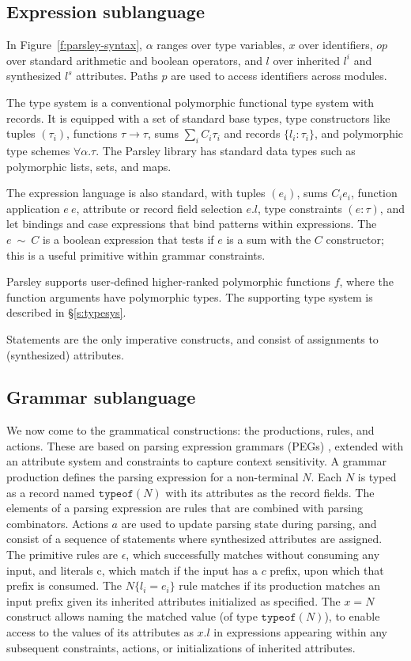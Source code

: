 \documentclass[letterpaper]{article}
\begin{document}
\subsection*{Expression sublanguage}
\label{ss:lang:expr}

In Figure~\ref{f:parsley-syntax}, $\alpha$ ranges over type variables,
$x$ over identifiers, $op$ over standard arithmetic and boolean
operators, and $l$ over inherited $l^i$ and synthesized $l^s$
attributes.  Paths $p$ are used to access identifiers across modules.

The type system is a conventional polymorphic functional type system
with records.  It is equipped with a set of standard base types, type
constructors like tuples $(\tau_i)$, functions $\tau\rightarrow\tau$,
sums $\sum_iC_i\tau_i$ and records $\{l_i:\tau_i\}$, and
polymorphic type schemes $\forall\alpha.\tau$.  The Parsley library
has standard data types such as polymorphic lists, sets, and maps.

The expression language is also standard, with tuples $(e_i)$, sums
$C_i e_i$, function application $e\ e$, attribute or record field
selection $e.l$, type constraints $(e:\tau)$, and let bindings and
case expressions that bind patterns within expressions.  The
$e\ \sim\ C$ is a boolean expression that tests if $e$ is a sum with
the $C$ constructor; this is a useful primitive within grammar
constraints.

Parsley supports user-defined higher-ranked polymorphic functions $f$,
where the function arguments have polymorphic types.  The supporting
type system is described in \S\ref{s:typesys}.

Statements are the only imperative constructs, and consist of
assignments to (synthesized) attributes.

\subsection*{Grammar sublanguage}
\label{ss:lang:grammar}

We now come to the grammatical constructions: the productions, rules,
and actions.  These are based on parsing expression grammars (PEGs)
\cite{ford2004popl}, extended with an attribute system and constraints
to capture context sensitivity.  A grammar production defines the
parsing expression for a non-terminal $N$.  Each $N$ is typed as a
record named $\texttt{typeof}(N)$ with its attributes as the record
fields.  The elements of a parsing expression are rules that are
combined with parsing combinators.  Actions $a$ are used to update
parsing state during parsing, and consist of a sequence of statements
where synthesized attributes are assigned.  The primitive rules are
$\epsilon$, which successfully matches without consuming any input,
and literals $\textrm{c}$, which match if the input has a $c$ prefix,
upon which that prefix is consumed.  The $N\{l_i=e_i\}$ rule matches
if its production matches an input prefix given its inherited
attributes initialized as specified.  The $x=N$ construct allows
naming the matched value (of type $\texttt{typeof}(N)$), to enable
access to the values of its attributes as $x.l$ in expressions
appearing within any subsequent constraints, actions, or
initializations of inherited attributes.
\end{document}
